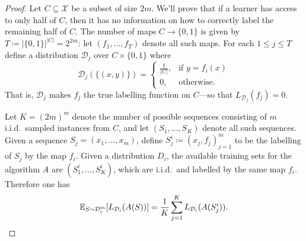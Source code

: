\begin{proof}
    Let \(C \subseteq \mathcal{X}\) be a subset of size \(2 m\). We'll prove that if
    a learner has access to only half of \(C\), then it has no information on how to
    correctly label the remaining half of \(C\). The number of maps
    \(C \to \{0, 1\}\) is given by \(T \coloneq |\{0, 1\}|^{|C|} = 2^{2m}\): let
    \((f_1, \dots, f_T)\) denote all such maps. For each \(1 \leq j \leq T\) define
    a distribution \(\mathcal{D}_j\) over \(C \times \{0, 1\}\) where
    \[
        \mathcal{D}_j(\{(x, y)\}) =
        \begin{cases}
            \frac{1}{|C|}, & \text{if } y = f_i(x) \\
            0,             & \text{otherwise.}
        \end{cases}
    \]
    That is, \(\mathcal{D}_j\) makes \(f_j\) the true labelling function on
    \(C\)---so that \(L_{\mathcal{D}_j}(f_j) = 0\).

    Let \(K = (2 m)^m\) denote the number of possible sequences consisting of \(m\)
    i.i.d.~sampled instances from \(C\), and let \((S_1, \dots, S_K)\) denote all
    such sequences. Given a sequence \(S_j = (x_1, \dots, x_m)\), define
    \(S_j^i \coloneq (x_j, f_j)_{j=1}^m\) to be the labelling of \(S_j\) by the map
    \(f_i\). Given a distribution \(D_i\), the available training sets for the
    algorithm \(A\) are \((S_1^i, \dots, S_K^i)\), which are i.i.d.~and labelled by
    the same map \(f_i\). Therefore one has
    \begin{equation}\label{eq:nfl-expect-AS}
        \operatorname{\mathbb{E}}_{S \sim \mathcal{D}_i^m}[L_{\mathcal{D}_i}(A(S))]
        = \frac{1}{K} \sum_{j=1}^K L_{\mathcal{D}_i}(A(S_{j}^i)).
    \end{equation}


\end{proof}
